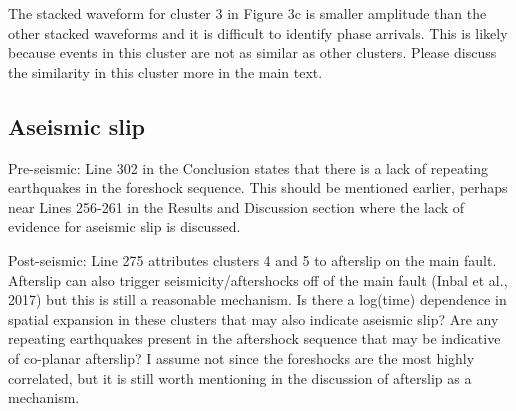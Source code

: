 \documentclass[10pt]{extarticle}
\begin{document}
\begin{Answer}
 \WorkInProgressRevTask
\end{Answer}
%
%



\begin{ReviewerComment}{2}
\noindent 
The stacked waveform for cluster 3 in Figure 3c is smaller amplitude than the other stacked waveforms and it is difficult to identify phase arrivals. This is likely because events in this cluster are not as similar as other clusters. Please discuss the similarity in this cluster more in the main text.

\end{ReviewerComment}


\begin{Answer}
 \WorkInProgressRevTask
\end{Answer}
%
%


\subsection*{Aseismic slip}


\begin{ReviewerComment}{2}
\noindent 
Pre-seismic: Line 302 in the Conclusion states that there is a lack of repeating earthquakes in the foreshock sequence. This should be mentioned earlier, perhaps near Lines 256-261 in the Results and Discussion section where the lack of evidence for aseismic slip is discussed.

\end{ReviewerComment}


\begin{Answer}
 \WorkInProgressRevTask
\end{Answer}
%
%



\begin{ReviewerComment}{2}
\noindent 
Post-seismic: Line 275 attributes clusters 4 and 5 to afterslip on the main fault. Afterslip can also trigger seismicity/aftershocks off of the main fault (Inbal et al., 2017) but this is still a reasonable mechanism. Is there a log(time) dependence in spatial expansion in these clusters that may also indicate aseismic slip? Are any repeating earthquakes present in the aftershock sequence that may be indicative of co-planar afterslip? I assume not since the foreshocks are the most highly correlated, but it is still worth mentioning in the discussion of afterslip as a mechanism.
\end{ReviewerComment}
\end{document}
